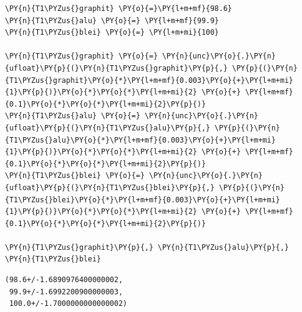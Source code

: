     \begin{tcolorbox}[breakable, size=fbox, boxrule=1pt, pad at break*=1mm,colback=cellbackground, colframe=cellborder]
\begin{Verbatim}[commandchars=\\\{\}]
\PY{n}{T1\PYZus{}graphit} \PY{o}{=}\PY{l+m+mf}{98.6}
\PY{n}{T1\PYZus{}alu} \PY{o}{=} \PY{l+m+mf}{99.9}
\PY{n}{T1\PYZus{}blei} \PY{o}{=} \PY{l+m+mi}{100}

\PY{n}{T1\PYZus{}graphit} \PY{o}{=} \PY{n}{unc}\PY{o}{.}\PY{n}{ufloat}\PY{p}{(}\PY{n}{T1\PYZus{}graphit}\PY{p}{,} \PY{p}{(}\PY{n}{T1\PYZus{}graphit}\PY{o}{*}\PY{l+m+mf}{0.003}\PY{o}{+}\PY{l+m+mi}{1}\PY{p}{)}\PY{o}{*}\PY{o}{*}\PY{l+m+mi}{2} \PY{o}{+} \PY{l+m+mf}{0.1}\PY{o}{*}\PY{o}{*}\PY{l+m+mi}{2}\PY{p}{)}
\PY{n}{T1\PYZus{}alu} \PY{o}{=} \PY{n}{unc}\PY{o}{.}\PY{n}{ufloat}\PY{p}{(}\PY{n}{T1\PYZus{}alu}\PY{p}{,} \PY{p}{(}\PY{n}{T1\PYZus{}alu}\PY{o}{*}\PY{l+m+mf}{0.003}\PY{o}{+}\PY{l+m+mi}{1}\PY{p}{)}\PY{o}{*}\PY{o}{*}\PY{l+m+mi}{2} \PY{o}{+} \PY{l+m+mf}{0.1}\PY{o}{*}\PY{o}{*}\PY{l+m+mi}{2}\PY{p}{)}
\PY{n}{T1\PYZus{}blei} \PY{o}{=} \PY{n}{unc}\PY{o}{.}\PY{n}{ufloat}\PY{p}{(}\PY{n}{T1\PYZus{}blei}\PY{p}{,} \PY{p}{(}\PY{n}{T1\PYZus{}blei}\PY{o}{*}\PY{l+m+mf}{0.003}\PY{o}{+}\PY{l+m+mi}{1}\PY{p}{)}\PY{o}{*}\PY{o}{*}\PY{l+m+mi}{2} \PY{o}{+} \PY{l+m+mf}{0.1}\PY{o}{*}\PY{o}{*}\PY{l+m+mi}{2}\PY{p}{)}

\PY{n}{T1\PYZus{}graphit}\PY{p}{,} \PY{n}{T1\PYZus{}alu}\PY{p}{,} \PY{n}{T1\PYZus{}blei}
\end{Verbatim}
\end{tcolorbox}

            \begin{tcolorbox}[breakable, size=fbox, boxrule=.5pt, pad at break*=1mm, opacityfill=0]
\begin{Verbatim}[commandchars=\\\{\}]
(98.6+/-1.6890976400000002,
 99.9+/-1.6992200900000003,
 100.0+/-1.7000000000000002)
\end{Verbatim}
\end{tcolorbox}
        

